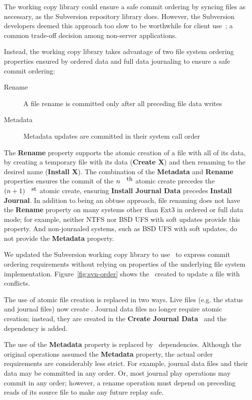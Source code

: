 The working copy library could ensure a safe commit ordering by
syncing files as necessary, as the Subversion repository library does.
%
However, the Subversion developers deemed this approach too slow to be
worthwhile for client use~\cite{svntradeoff}; a common trade-off
decision among non-server applications.

Instead, the working copy library takes advantage of two file system
ordering properties ensured by ordered data and full data journaling
to ensure a safe commit ordering:
\begin{description}
\item[Rename] A file rename is committed only after all preceding file
  data writes
\item[Metadata] Metadata updates are committed in their system call order
\end{description}
%
The \textbf{Rename} property supports the atomic creation of a file
with all of its data, by creating a temporary file with its data
(\textbf{Create X}) and then renaming to the desired name
(\textbf{Install X}).
%
The combination of the \textbf{Metadata} and \textbf{Rename}
properties ensures the commit of the $n^{\mbox{\small{th}}}$ atomic
create precedes the \((n+1)^{\mbox{\small{st}}}\) atomic create,
ensuring \textbf{Install Journal Data} precedes \textbf{Install
  Journal}.
%
In addition to being an obtuse approach, file renaming does not have
the \textbf{Rename} property on many systems other than Ext3 in
ordered or full data mode; for example, neither NTFS nor BSD UFS with
soft updates provide this property.
%
And non-journaled systems, such as BSD UFS with soft updates, do not
provide the \textbf{Metadata} property.

We updated the Subversion working copy library to use \opgroups\ to
express commit ordering requirements without relying on properties of the
underlying file system implementation.
%
Figure~\ref{fig:svn-order} shows the \opgroups\ created to update a
file with conflicts.

The use of atomic file creation is replaced in two ways.
%
Live files (e.g. the status and journal files) now create
.
%
Journal data files no longer require atomic creation; instead, they
are created in the \textbf{Create Journal Data} \opgroup\ and the
dependency is added.

The use of the \textbf{Metadata} property is replaced by \opgroup\
dependencies.
%
Although the original operations assumed the \textbf{Metadata}
property, the actual order requirements are considerably less strict.
%
For example, journal data files and their data may be committed in any
order.
%
Or, most journal play operations may commit in any order; however, a
rename operation must depend on preceding reads of its source file to
make any future replay safe.

